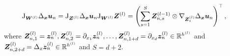 \begin{align*}
    \jac_{\mW^{(l)}} \Delta_\vx \vu_n & = \jac_{\mZ^{(l)}}\Delta_\vx \vu_n \jac_{\mW^{(l)}} \mZ^{(l)} %
    = \left(\sum_{s=1}^S \mZ^{(l-1)}_{n,s} \otimes \nabla_{\mZ^{(l)}_s} \Delta_{\vx}\vu_n\right)^\top,
\end{align*}
where ${\bm{Z}}_{n, 1}^{(l)} = {\bm{z}}_n^{(l)}, {\bm{Z}}_{n, 2}^{(l)} = \partial_{x_1}{\bm{z}}_n^{(l)}, \dots, {\bm{Z}}_{n, 1+d}^{(l)} = \partial_{x_d}{\bm{z}}_n^{(l)}\in\mathbb R^{h^{(l)}}$ and ${\bm{Z}}_{n, 2+d}^{(l)} = \Delta_x{\bm{z}}_n^{(l)}\in\mathbb R^{h^{(l)}}$ and $S=d+2$.
